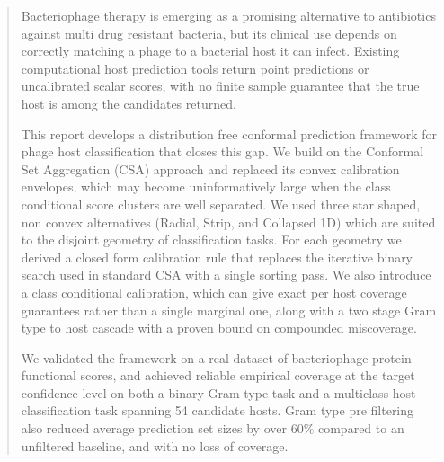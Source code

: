 
\begin{abstract}
\noindent
Bacteriophage therapy is emerging as a promising alternative to antibiotics against multi drug resistant bacteria,
but its clinical use depends on correctly matching a phage to a bacterial host it can infect. Existing computational
host prediction tools return point predictions or uncalibrated scalar scores, with no finite sample guarantee that
the true host is among the candidates returned.

This report develops a distribution free conformal prediction framework for phage host classification that closes
this gap. We build on the Conformal Set Aggregation (CSA) approach and replaced its convex calibration envelopes,
which may become uninformatively large when the class conditional score clusters are well separated. We used three star shaped,
non convex alternatives (Radial, Strip, and Collapsed 1D) which are suited to the disjoint geometry of classification
tasks. For each geometry we derived a closed form calibration rule that replaces the iterative binary search used in
standard CSA with a single sorting pass. We also introduce a class conditional calibration, which can give exact per host
coverage guarantees rather than a single marginal one, along with a two stage Gram type to host cascade with a
proven bound on compounded miscoverage.

We validated the framework on a real dataset of bacteriophage protein functional scores, and achieved reliable
empirical coverage at the target confidence level on both a binary Gram type task and a multiclass host
classification task spanning 54 candidate hosts. Gram type pre filtering also reduced average prediction set sizes
by over $60\%$ compared to an unfiltered baseline, and with no loss of coverage.
\end{abstract}
\vspace{0.3cm}






